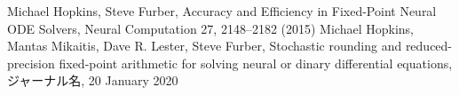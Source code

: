 \begin{thebibliography}{9}
     Michael Hopkins, Steve Furber, Accuracy and Efficiency in Fixed-Point Neural ODE Solvers, Neural Computation 27, 2148–2182 (2015)
     Michael Hopkins, Mantas Mikaitis, Dave R. Lester, Steve Furber, Stochastic rounding and reduced-precision fixed-point arithmetic for solving neural or dinary differential equations, ジャーナル名, 20 January 2020
\end{thebibliography}
